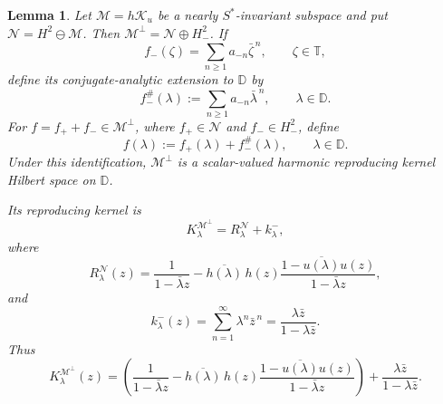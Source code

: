 \documentclass[10pt,a4paper]{amsart}
\newtheorem{lemma}[theorem]{Lemma}
\def \D{\mathbb{D}}
\def \T{\mathbb{T}}
\newcommand{\clm}{\mathcal{M}}
\newcommand{\cln}{\mathcal{N}}
\newcommand{\clk}{\mathcal{K}}
\numberwithin{equation}{section}
\begin{document}
\begin{lemma}\label{lem:RKHS}
Let $\clm=h\clk_u$ be a nearly $S^*$-invariant subspace and put $\cln=H^2\ominus\clm$. Then $\clm^\perp=\cln\oplus H_{-}^2$.
If
\[
f_{-}(\zeta)
= \sum_{n\geq1}a_{-n}\bar\zeta^{\,n},\qquad \zeta\in\T,
\]
define its conjugate-analytic extension to $\D$ by
\[
f_{-}^\#(\lambda)
:=\sum_{n\geq1}a_{-n}\bar\lambda^{\,n},\qquad \lambda\in\D.
\]
For $f=f_{+}+f_{-}\in\clm^\perp$, where
$f_{+}\in\cln$ and $f_{-}\in H_{-}^2$, define
\[
f(\lambda)
:=f_{+}(\lambda)+f_{-}^\#(\lambda),\qquad \lambda\in\D.
\]
Under this identification, $\clm^\perp$ is a scalar-valued harmonic reproducing kernel Hilbert space on $\D$.

Its reproducing kernel is
\[
K_\lambda^{\clm^\perp}
=
R_\lambda^\cln+k_\lambda^-,
\]
where
\[
R_\lambda^\cln(z)
=
\frac{1}{1-\bar\lambda z}
-
\overline{h(\lambda)}\,h(z)
\frac{1-\overline{u(\lambda)}u(z)}{1-\bar\lambda z},
\]
and
\[
k_\lambda^-(z)
= \sum_{n=1}^{\infty}\lambda^n\bar z^{\,n}
= \frac{\lambda\bar z}{1-\lambda\bar z}.
\]
Thus
\[
K_\lambda^{\clm^\perp}(z)
= \left(\frac{1}{1-\bar\lambda z}-\overline{h(\lambda)}\,h(z)
\frac{1-\overline{u(\lambda)}u(z)}{1-\bar\lambda z}\right)
+\frac{\lambda\bar z}{1-\lambda\bar z}.
\]
\end{lemma}
\end{document}

